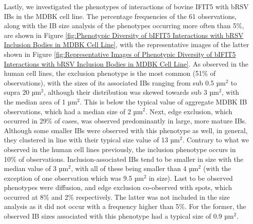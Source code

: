 Lastly, we investigated the phenotypes of interactions of bovine IFIT5 with bRSV IBs in the MDBK cell line. The percentage frequencies of the 61 observations, along with the IB size analysis of the phenotypes occurring more often than 5\%, are shown in Figure \ref{fig:Phenotypic Diversity of bIFIT5 Interactions with bRSV Inclusion Bodies in MDBK Cell Line}, with the representative images of the latter shown in Figure \ref{fig:Representative Images of Phenotypic Diversity of bIFIT5 Interactions with bRSV Inclusion Bodies in MDBK Cell Line}. As observed in the human cell lines, the exclusion phenotype is the most common (51\% of observations), with the sizes of its associated IBs ranging from sub 0.5 \(\mbox{µm}^2\) to supra 20 \(\mbox{µm}^2\), although their distribution was skewed towards sub 3 \(\mbox{µm}^2\), with the median area of 1 \(\mbox{µm}^2\). This is below the typical value of aggregate MDBK IB observations, which had a median size of 2 \(\mbox{µm}^2\). Next, edge exclusion, which occurred in 29\% of cases, was observed predominantly in large, more mature IBs. Although some smaller IBs were observed with this phenotype as well, in general, they clustered in line with their typical size value of 13 \(\mbox{µm}^2\). Contrary to what we observed in the human cell lines previously, the inclusion phenotype occurs in 10\% of observations. Inclusion-associated IBs tend to be smaller in size with the median value of 3 \(\mbox{µm}^2\), with all of these being smaller than 4 \(\mbox{µm}^2\) (with the exception of one observation which was 9.5 \(\mbox{µm}^2\) in size). Last to be observed phenotypes were diffusion, and edge exclusion co-observed with spots, which occurred at 8\% and 2\% respectively. The latter was not included in the size analysis as it did not occur with a frequency higher than 5\%. For the former, the observed IB sizes associated with this phenotype had a typical size of 0.9 \(\mbox{µm}^2\).

